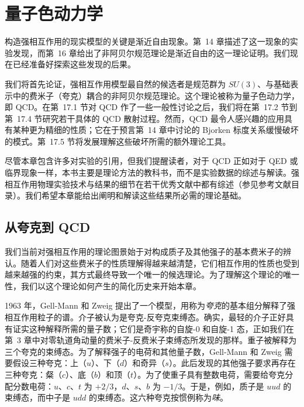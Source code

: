 \chapter{量子色动力学}

构造强相互作用的现实模型的关键是渐近自由现象。第~14 章描述了这一现象的实验发现，而第~16 章给出了非阿贝尔规范理论是渐近自由的这一理论证明。我们现在已经准备好探索这些发现的后果。

我们将首先论证，强相互作用模型最自然的候选者是规范群为 $SU(3)$、与基础表示中的费米子（夸克）耦合的非阿贝尔规范理论。这个理论被称为量子色动力学，即 QCD。在第~17.1 节对 QCD 作了一些一般性讨论之后，我们将在第~17.2 节到第~17.4 节研究若干具体的 QCD 散射过程。然而，QCD 最令人感兴趣的应用具有某种更为精细的性质；它在于预言第~14 章中讨论的 Bjorken 标度关系缓慢破坏的模式。第~17.5 节将发展理解这些破坏所需的额外理论工具。

尽管本章包含许多对实验的引用，但我们提醒读者，对于 QCD 正如对于 QED 或临界现象一样，本书主要是理论方法的教科书，而不是实验数据的综述与解读。强相互作用物理实验技术与结果的细节在若干优秀文献中都有综述（参见参考文献目录）。我们希望本章能给出阐明和解读这些结果所必需的理论基础。

\section{从夸克到 QCD}

我们当前对强相互作用的理论图景始于对构成质子及其他强子的基本费米子的辨认。随着人们对这些费米子的性质理解得越来越清楚，它们相互作用的性质也受到越来越强的约束，其方式最终导致一个唯一的候选理论。为了理解这个理论的唯一性，我们以这个理论如何产生的简化历史来开始本章。

1963 年，Gell-Mann 和 Zweig 提出了一个模型，用称为\emph{夸克}的基本组分解释了强相互作用粒子的谱。介子被认为是夸克-反夸克束缚态。确实，最轻的介子正好具有证实这种解释所需的量子数；它们是奇宇称的自旋-0 和自旋-1 态，正如我们在第~3 章中对零轨道角动量的费米子-反费米子束缚态所发现的那样。重子被解释为三个夸克的束缚态。为了解释强子的电荷和其他量子数，Gell-Mann 和 Zweig 需要假设三种夸克：上（$u$）、下（$d$）和奇异（$s$）。此后发现的其他强子要求再存在三种夸克：粲（$c$）、底（$b$）和顶（$t$）。为了使重子具有整数电荷，需要给夸克分配分数电荷：$u$、$c$、$t$ 为 $+2/3$，$d$、$s$、$b$ 为 $-1/3$。于是，例如，质子是 $uud$ 的束缚态，而中子是 $udd$ 的束缚态。这六种夸克按惯例称为\emph{味}。

